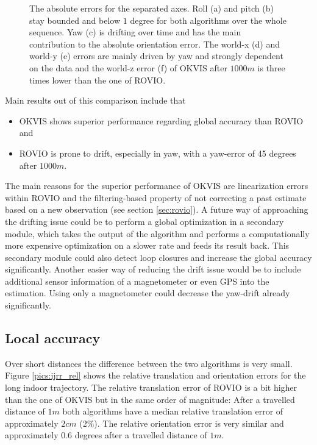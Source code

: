 \begin{figure}[h]
\begin{subfigure}[b]{0.48\textwidth}
    \caption{}
  \end{subfigure}
   \caption{The absolute errors for the separated axes. Roll (a) and pitch (b) stay bounded and below $1$ degree for both algorithms over the whole sequence. Yaw (c) is drifting over time and has the main contribution to the absolute orientation error. The world-x (d) and world-y (e) errors are mainly driven by yaw and strongly dependent on the data and the world-z error (f) of OKVIS after $1000 m$ is three times lower than the one of ROVIO.}
   \label{pics:ijrr_abs_separate}
\end{figure}

Main results out of this comparison include that
\begin{itemize}
\item OKVIS shows superior performance regarding global accuracy than ROVIO and
\item ROVIO is prone to drift, especially in yaw, with a yaw-error of 45 degrees after $1000m$.
\end{itemize}

The main reasons for the superior performance of OKVIS are linearization errors within ROVIO and the filtering-based property of not correcting a past estimate based on a new observation (see section \ref{sec:rovio}). 
A future way of approaching the drifting issue could be to perform a global optimization in a secondary module, which takes the output of the algorithm and performs a computationally more expensive optimization on a slower rate and feeds its result back. This secondary module could also detect loop closures and increase the global accuracy significantly. Another easier way of reducing the drift issue would be to include additional sensor information of a magnetometer or even GPS into the estimation. Using only a magnetometer could decrease the yaw-drift already significantly.


\subsection{Local accuracy}
\label{sec:ijrr_local}

Over short distances the difference between the two algorithms is very small. Figure \ref{pics:ijrr_rel} shows the relative translation and orientation errors for the long indoor trajectory. The relative translation error of ROVIO is a bit higher than the one of OKVIS but in the same order of magnitude: After a travelled distance of $1 m$ both algorithms have a median relative translation error of approximately $2cm$ ($2\%$). The relative orientation error is very similar and approximately $0.6$ degrees after a travelled distance of $1m$.

